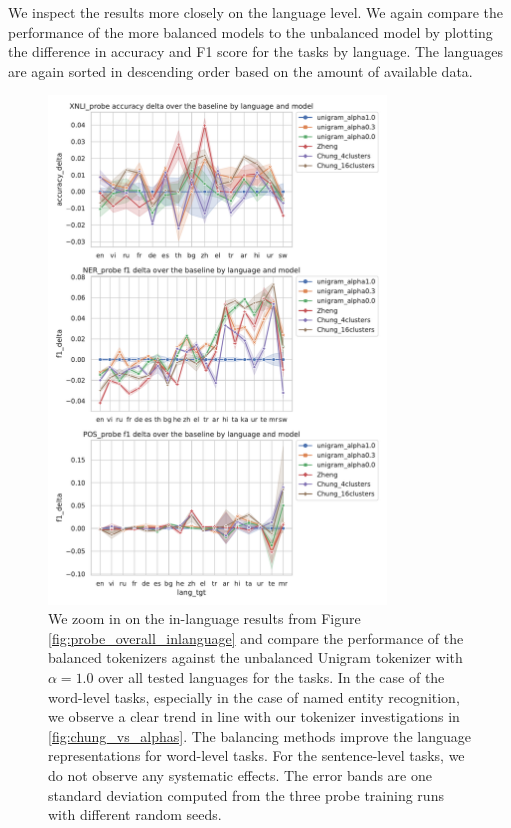 We inspect the results more closely on the language level. We again compare the performance of the more balanced models to the unbalanced model by plotting the difference in accuracy and F1 score for the tasks by language. The languages are again sorted in descending order based on the amount of available data. 

\begin{figure}
    \centering
    \includegraphics[width=0.8\textwidth]{figures/probe_detailed_inlanguage_over_baseline.pdf}
    \caption{We zoom in on the in-language results from Figure \ref{fig:probe_overall_inlanguage} and compare the performance of the balanced tokenizers against the unbalanced Unigram tokenizer with $\alpha=1.0$ over all tested languages for the tasks. In the case of the word-level tasks, especially in the case of named entity recognition, we observe a clear trend in line with our tokenizer investigations in \ref{fig:chung_vs_alphas}. The balancing methods improve the language representations for word-level tasks. For the sentence-level tasks, we do not observe any systematic effects. The error bands are one standard deviation computed from the three probe training runs with different random seeds.}
    \label{fig:probe_overall_inlanguage_over_baseline}
\end{figure}

